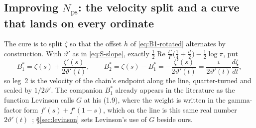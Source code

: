 \documentclass[11pt]{article}
\theoremstyle{definition}
\begin{document}
\subsection{Improving \texorpdfstring{$N_{\mathrm{ps}}$}{Nps}: the velocity
split and a curve that lands on every ordinate}\label{sec:counting-star}

The cure is to split $\zeta$ so that the offset $h$ of \eqref{eq:B1-rotated}
alternates by construction. With $\vartheta'$ as in \eqref{eq:S-slope}, exactly
$\tfrac12\operatorname{Re}\tfrac{\Gamma'}{\Gamma}\bigl(\tfrac14+\tfrac{it}{2}\bigr)-\tfrac12\log\pi$,
put
\begin{equation}\label{eq:vel-split}
B_1^{\ast}=\zeta(s)+\frac{\zeta'(s)}{2\vartheta'(t)},\qquad
B_2^{\ast}=\zeta(s)-B_1^{\ast}=-\frac{\zeta'(s)}{2\vartheta'(t)}
=\frac{i}{2\vartheta'(t)}\frac{d\zeta}{dt},
\end{equation}
so leg~2 is the velocity of the chain's endpoint along the line, quarter-turned
and scaled by $1/2\vartheta'$. The companion $B_1^{\ast}$ already appears in
the literature as the function Levinson calls $G$ at his (1.9), where the weight is written in the
gamma-factor form $f'(s)+f'(1-s)$, which on the line is this same real number
$2\vartheta'(t)$~\cite{Levinson1974}; \S\ref{sec:levinson} sets Levinson's use
of $G$ beside ours.
\end{document}

